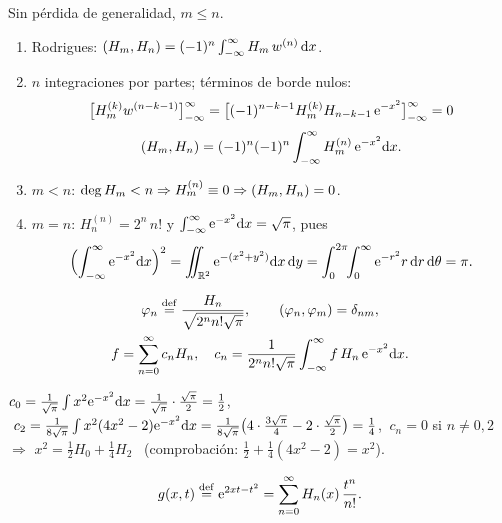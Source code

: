 \documentclass[11pt,a4paper,twoside]{article}
\begin{document}
\begin{demostracion}
Sin pérdida de generalidad, $m\le n$.
\begin{enumerate}
\item Rodrigues: $\left(H_m,H_n\right)=(-1)^n\int_{-\infty}^{\infty}H_m\,w^{(n)}\,\mathrm{d} x$.
\item $n$ integraciones por partes; términos de borde nulos:
\[
\bigl[H_m^{(k)}w^{(n-k-1)}\bigr]_{-\infty}^{\infty}=\bigl[(-1)^{n-k-1}H_m^{(k)}H_{n-k-1}\,\mathrm{e}^{-x^2}\bigr]_{-\infty}^{\infty}=0
\]
\[
\left(H_m,H_n\right)=(-1)^n(-1)^n\int_{-\infty}^{\infty}H_m^{(n)}\,\mathrm{e}^{-x^2}\mathrm{d} x .
\]
\item $m<n$: $\deg H_m<n\Rightarrow H_m^{(n)}\equiv0\Rightarrow\left(H_m,H_n\right)=0$.
\item $m=n$: $H_n^{(n)}=2^n\,n!$ y $\int_{-\infty}^\infty\mathrm{e}^{-x^2}\mathrm{d} x=\sqrt\pi$, pues
\[
\Bigl(\int_{-\infty}^{\infty}\mathrm{e}^{-x^2}\mathrm{d} x\Bigr)^2=\iint_{\mathbb{R}^2}\mathrm{e}^{-(x^2+y^2)}\mathrm{d} x\,\mathrm{d} y=\int_0^{2\pi}\!\!\int_0^\infty\mathrm{e}^{-r^2}r\,\mathrm{d} r\,\mathrm{d}\theta=\pi .
\]
\end{enumerate}
\end{demostracion}

\begin{corolario}
\begin{gather}
\varphi_n\stackrel{\mathrm{def}}{=}\frac{H_n}{\sqrt{2^nn!\sqrt\pi}},\qquad \left(\varphi_n,\varphi_m\right)=\delta_{nm},\notag\\
f=\sum_{n=0}^\infty c_nH_n,\quad c_n=\frac{1}{2^nn!\sqrt\pi}\int_{-\infty}^{\infty}f\,H_n\,\mathrm{e}^{-x^2}\mathrm{d} x .
\end{gather}
\end{corolario}

\begin{ejemplo}[Desarrollo de $x^2$]
$c_0=\frac{1}{\sqrt\pi}\int x^2\mathrm{e}^{-x^2}\mathrm{d} x=\frac{1}{\sqrt\pi}\cdot\frac{\sqrt\pi}{2}=\frac12$,
$\ c_2=\frac{1}{8\sqrt\pi}\int x^2(4x^2-2)\mathrm{e}^{-x^2}\mathrm{d} x=\frac{1}{8\sqrt\pi}\bigl(4\cdot\tfrac{3\sqrt\pi}{4}-2\cdot\tfrac{\sqrt\pi}{2}\bigr)=\frac14$,
$\ c_{n}=0$ si $n\neq0,2$ $\Rightarrow$ $x^2=\tfrac12H_0+\tfrac14H_2$ \ (comprobación: $\tfrac12+\tfrac14(4x^2-2)=x^2$).
\end{ejemplo}

\begin{proposicion}
\begin{equation}\label{eq:generatriz}
g(x,t)\stackrel{\mathrm{def}}{=}\mathrm{e}^{2xt-t^2}=\sum_{n=0}^\infty H_n(x)\,\frac{t^n}{n!}.
\end{equation}
\end{proposicion}
\end{document}
